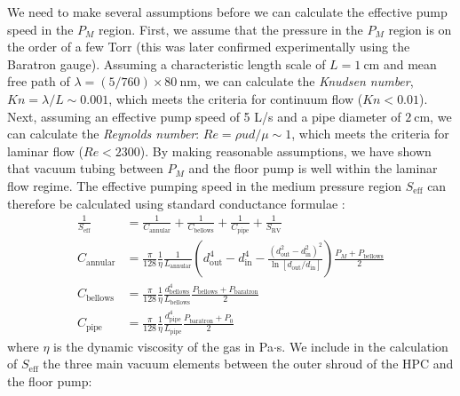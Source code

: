We need to make several assumptions before we can calculate the effective pump speed in the $P_M$ region. First, we assume that the pressure in the $P_M$ region is on the order of a few Torr (this was later confirmed experimentally using the Baratron gauge). Assuming a characteristic length scale of $L = 1 \ \textrm{cm}$ and mean free path of $\lambda = (5/760) \times 80 \ \textrm{nm}$, we can calculate the \textit{Knudsen number}, $Kn = \lambda / L \sim 0.001$, which meets the criteria for continuum flow ($Kn < 0.01$). Next, assuming an effective pump speed of 5 L/s and a pipe diameter of $2 \ \textrm{cm}$, we can calculate the \textit{Reynolds number}: $Re = \rho u d / \mu \sim 1$, which meets the criteria for laminar flow ($Re < 2300$). By making reasonable assumptions, we have shown that vacuum tubing between $P_M$ and the floor pump is well within the laminar flow regime. The effective pumping speed in the medium pressure region $S_{\textrm{eff}}$ can therefore be calculated using standard conductance formulae \cite{joustenHandbookVacuumTechnology2016}:
\begin{equation}
\begin{aligned}
\frac{1}{S_{\textrm{eff}}} &= \frac{1}{C_{\textrm{annular}}} + \frac{1}{C_{\textrm{bellows}}} + \frac{1}{C_{\textrm{pipe}}} + \frac{1}{S_{\textrm{RV}}} \\
C_{\textrm{annular}} &= \frac{\pi}{128} \frac{1}{\eta} \frac{1}{L_{\textrm{annular}}} \left( d_{\textrm{out}}^4 - d_{\textrm{in}}^4 - \frac{(d_{\textrm{out}}^2 - d_{\textrm{in}}^2)^2}{\ln \left[d_{\textrm{out}}/d_{\textrm{in}}\right]} \right) \frac{P_M + P_{\textrm{bellows}}}{2} \\
C_{\textrm{bellows}} &= \frac{\pi}{128} \frac{1}{\eta} \frac{d_{\textrm{bellows}}^4}{L_{\textrm{bellows}}} \frac{P_{\textrm{bellows}} + P_{\textrm{baratron}}}{2} \\
C_{\textrm{pipe}} &= \frac{\pi}{128} \frac{1}{\eta} \frac{d_{\textrm{pipe}}^4}{L_{\textrm{pipe}}} \frac{P_{\textrm{baratron}} + P_0}{2}
\end{aligned}
\label{eqn:HPC-Seff-equations}
\end{equation}
where $\eta$ is the dynamic viscosity of the gas in Pa$\cdot$s. We include in the calculation of $S_{\textrm{eff}}$ the three main vacuum elements between the outer shroud of the HPC and the floor pump:
